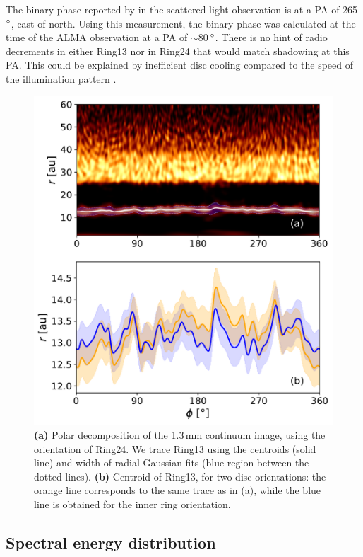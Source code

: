 \documentclass[fleqn,usenatbib,useAMS]{mnras}
\begin{document}
The binary phase reported by \citet{dOrazi} in the scattered light observation is at a PA of 265\,$\hbox{$^\circ$}$, east of north. Using this measurement, the binary phase was calculated at the time of the ALMA observation at a PA of $\sim$80\,$\hbox{$^\circ$}$. There is no hint of radio decrements in either Ring13 nor in Ring24 that would match shadowing at this PA. This could be explained by inefficient disc cooling compared to the speed of the illumination pattern \citep[see ][ for estimates of this cooling timescale]{Casassus2019MNRAS.486L..58C}.

\begin{figure}
    \includegraphics[width=\columnwidth]{polar_ring_aprox_and_diff_inner.pdf}
    \caption{{\bf (a)} Polar decomposition of the 1.3\,mm continuum image, using the orientation of Ring24. We trace Ring13 using the centroids (solid line) and width of radial Gaussian fits (blue region between the dotted lines). {\bf (b)} Centroid of Ring13, for two disc orientations: the orange line corresponds to the same trace as in (a), while the blue line is obtained for the inner ring orientation.}
    \label{fig:polarring}
\end{figure}

\subsection{Spectral energy distribution} \label{subsec:SED}
\end{document}
